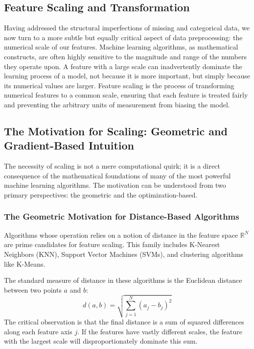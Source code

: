\begin{itemize}
\section{Feature Scaling and Transformation}
\label{sec:feature_scaling}

Having addressed the structural imperfections of missing and categorical data, we now turn to a more subtle but equally critical aspect of data preprocessing: the numerical scale of our features. Machine learning algorithms, as mathematical constructs, are often highly sensitive to the magnitude and range of the numbers they operate upon. A feature with a large scale can inadvertently dominate the learning process of a model, not because it is more important, but simply because its numerical values are larger. Feature scaling is the process of transforming numerical features to a common scale, ensuring that each feature is treated fairly and preventing the arbitrary units of measurement from biasing the model.

\subsection{The Motivation for Scaling: Geometric and Gradient-Based Intuition}
\label{subsec:scaling_motivation}
The necessity of scaling is not a mere computational quirk; it is a direct consequence of the mathematical foundations of many of the most powerful machine learning algorithms. The motivation can be understood from two primary perspectives: the geometric and the optimization-based.

\subsubsection*{The Geometric Motivation for Distance-Based Algorithms}
Algorithms whose operation relies on a notion of distance in the feature space $\mathbb{R}^N$ are prime candidates for feature scaling. This family includes K-Nearest Neighbors (KNN), Support Vector Machines (SVMs), and clustering algorithms like K-Means.

The standard measure of distance in these algorithms is the Euclidean distance between two points $a$ and $b$:
$$ d(a, b) = \sqrt{\sum_{j=1}^{N} (a_j - b_j)^2} $$
The critical observation is that the final distance is a sum of squared differences along each feature axis $j$. If the features have vastly different scales, the feature with the largest scale will disproportionately dominate this sum.


\end{itemize}
